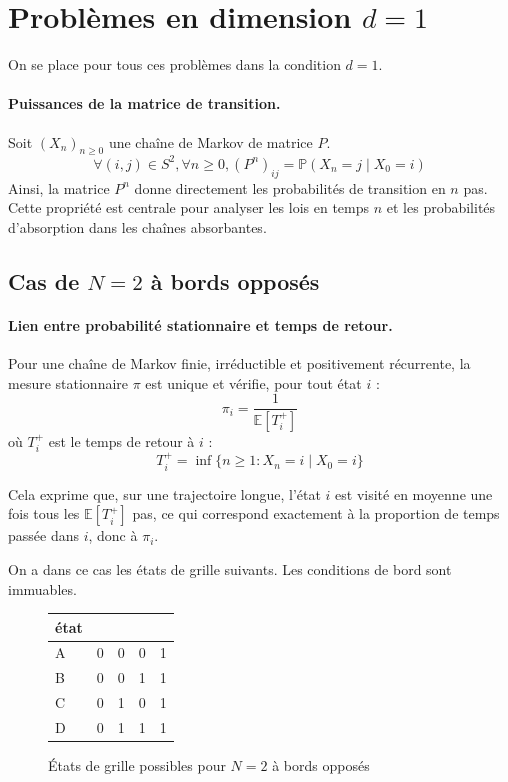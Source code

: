 \documentclass[11pt,a4paper]{article}
\begin{document}
\section{Problèmes en dimension $d = 1$}

On se place pour tous ces problèmes dans la condition $d = 1$.

\paragraph{Puissances de la matrice de transition.}

Soit $(X_n)_{n\geq 0}$ une chaîne de Markov de matrice $P$.
\[
\forall (i, j) \in S^2, \forall n \geq 0,
(P^{n})_{ij}
    = \mathbb{P}(X_n = j \mid X_0 = i)
\]
Ainsi, la matrice $P^n$ donne directement les probabilités de transition en $n$ pas.
Cette propriété est centrale pour analyser les lois en temps $n$ et les probabilités 
d'absorption dans les chaînes absorbantes.


\subsection{Cas de $N = 2$ à bords opposés}

\paragraph{Lien entre probabilité stationnaire et temps de retour.}

Pour une chaîne de Markov finie, irréductible et positivement récurrente,
la mesure stationnaire $\pi$ est unique et vérifie, pour tout état $i$ :
\[
\pi_i = \frac{1}{\mathbb{E}[T_i^{+}]}
\]
où $T_i^{+}$ est le temps de retour à $i$ :
\[
T_i^{+} = \inf\{n \ge 1 : X_n = i \mid X_0 = i\}
\]

Cela exprime que, sur une trajectoire longue, l'état $i$ est visité en moyenne
une fois tous les $\mathbb{E}[T_i^{+}]$ pas, ce qui correspond exactement à la
proportion de temps passée dans $i$, donc à $\pi_i$.


On a dans ce cas les états de grille suivants. Les conditions de bord
sont immuables.

\begin{figure}[h]
  \begin{center}
    \begin{tabular}{l | c | c c | c}
      état \\
      \hline
      A & 0 & 0 & 0 & 1 \\
      B & 0 & 0 & 1 & 1 \\
      C & 0 & 1 & 0 & 1 \\
      D & 0 & 1 & 1 & 1 \\
    \end{tabular}
  \end{center}
  \caption{États de grille possibles pour $N = 2$ à bords opposés}
\end{figure}
\end{document}

